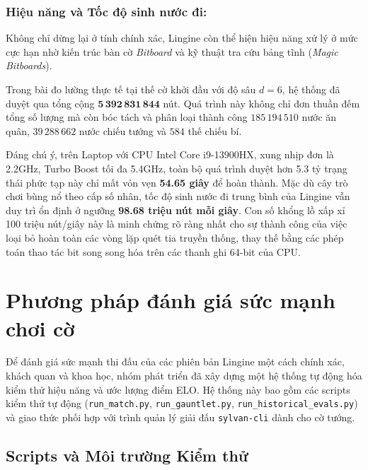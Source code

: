 \subsubsection{Hiệu năng và Tốc độ sinh nước đi:}

Không chỉ dừng lại ở tính chính xác, Lingine còn thể hiện hiệu năng xử lý ở mức cực hạn nhờ kiến trúc bàn cờ \textit{Bitboard} và kỹ thuật tra cứu bảng tĩnh (\textit{Magic Bitboards}). 

Trong bài đo lường thực tế tại thế cờ khởi đầu với độ sâu $d=6$, hệ thống đã duyệt qua tổng cộng $\mathbf{5\,392\,831\,844}$ nút. Quá trình này không chỉ đơn thuần đếm tổng số lượng mà còn bóc tách và phân loại thành công $185\,194\,510$ nước ăn quân, $39\,288\,662$ nước chiếu tướng và $584$ thế chiếu bí. 

Đáng chú ý, trên Laptop với CPU Intel Core i9-13900HX, xung nhịp đơn là 2.2GHz, Turbo Boost tối đa 5.4GHz, toàn bộ quá trình duyệt hơn 5.3 tỷ trạng thái phức tạp này chỉ mất vỏn vẹn \textbf{54.65 giây} để hoàn thành. Mặc dù cây trò chơi bùng nổ theo cấp số nhân, tốc độ sinh nước đi trung bình của Lingine vẫn duy trì ổn định ở ngưỡng \textbf{98.68 triệu nút mỗi giây}. Con số khổng lồ xấp xỉ 100 triệu nút/giây này là minh chứng rõ ràng nhất cho sự thành công của việc loại bỏ hoàn toàn các vòng lặp quét tia truyền thống, thay thế bằng các phép toán thao tác bit song song hóa trên các thanh ghi 64-bit của CPU.

\section{Phương pháp đánh giá sức mạnh chơi cờ}

Để đánh giá sức mạnh thi đấu của các phiên bản Lingine một cách chính xác, khách quan và khoa học, nhóm phát triển đã xây dựng một hệ thống tự động hóa kiểm thử hiệu năng và ước lượng điểm ELO. Hệ thống này bao gồm các scripts kiểm thử tự động (\texttt{run\_match.py}, \texttt{run\_gauntlet.py}, \texttt{run\_historical\_evals.py}) và giao thức phối hợp với trình quản lý giải đấu \texttt{sylvan-cli} dành cho cờ tướng.

\subsection{Scripts và Môi trường Kiểm thử}

